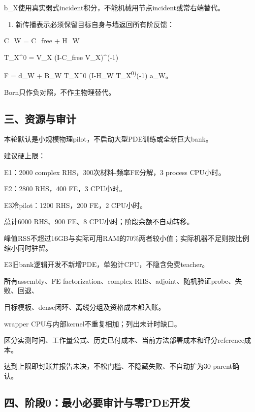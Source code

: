 \documentclass[
  10pt,
  a4paper,
]{article}
\providecommand{\tightlist}{%
  \setlength{\itemsep}{0pt}\setlength{\parskip}{0pt}}
\providecommand{\tightlist}{\setlength{\itemsep}{1pt}\setlength{\parskip}{1pt}}
\begin{document}
b\_X使用真实弱式incident积分，不能机械用节点incident或常右端替代。

\begin{enumerate}
\def\labelenumi{\arabic{enumi}.}
\setcounter{enumi}{8}
\tightlist
\item
  新传播表示必须保留目标自身与墙返回所有阶反馈：
\end{enumerate}

C\_W = C\_free + H\_W

T\_X\^{}0 = V\_X (I-C\_free V\_X)\^{}(-1)

F = d\_W + B\_W T\_X\^{}0 (I-H\_W T\_X\textsuperscript{0)}(-1) a\_W。

Born只作负对照，不作主物理替代。

\hypertarget{ux4e09ux8d44ux6e90ux4e0eux5ba1ux8ba1}{%
\subsection{三、资源与审计}\label{ux4e09ux8d44ux6e90ux4e0eux5ba1ux8ba1}}

本轮默认是小规模物理pilot，不启动大型PDE训练或全新巨大bank。

建议硬上限：

E1：2000 complex RHS，300次材料-频率FE分解，3 process CPU小时。

E2：2800 RHS，400 FE，3 CPU小时。

E3冷pilot：1200 RHS，200 FE，2 CPU小时。

总计6000 RHS、900 FE、8 CPU小时；阶段余额不自动转移。

峰值RSS不超过16GB与实际可用RAM的70\%两者较小值；实际机器不足则按比例缩小同时驻留。

E3旧bank逻辑开发不新增PDE，单独计CPU，不隐含免费teacher。

所有assembly、FE factorization、complex
RHS、adjoint、随机验证probe、失败、回退、

目标模板、dense闭环、离线分组及资格成本都入账。

wrapper CPU与内部kernel不重复相加；列出未计时缺口。

区分实测时间、工作量公式、历史已付成本、当前方法部署成本和评分reference成本。

达到上限即封账并报告未决，不松门槛、不隐藏失败、不自动扩为30-parent确认。

\hypertarget{ux56dbux9636ux6bb50ux6700ux5c0fux5fc5ux8981ux5ba1ux8ba1ux4e0eux96f6pdeux5f00ux53d1}{%
\subsection{四、阶段0：最小必要审计与零PDE开发}\label{ux56dbux9636ux6bb50ux6700ux5c0fux5fc5ux8981ux5ba1ux8ba1ux4e0eux96f6pdeux5f00ux53d1}}
\end{document}
